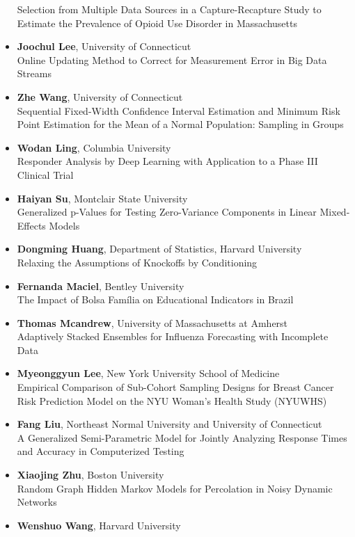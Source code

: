\begin{itemize}
Selection from Multiple Data Sources in a Capture-Recapture Study to Estimate the Prevalence of Opioid Use Disorder in Massachusetts
\item \textbf{Joochul Lee}, University of Connecticut \\
Online Updating Method to Correct for Measurement Error in Big Data Streams
\item \textbf{Zhe Wang}, University of Connecticut \\
Sequential Fixed-Width Confidence Interval Estimation and Minimum Risk Point Estimation for the Mean of a Normal Population: Sampling in Groups
\item \textbf{Wodan Ling}, Columbia University \\
Responder Analysis by Deep Learning with Application to a Phase III Clinical Trial
\item \textbf{Haiyan Su}, Montclair State University \\
Generalized p-Values for Testing Zero-Variance Components in Linear Mixed-Effects Models
\item \textbf{Dongming Huang}, Department of Statistics, Harvard University \\
Relaxing the Assumptions of Knockoffs by Conditioning
\item \textbf{Fernanda Maciel}, Bentley University \\
The Impact of Bolsa Família on Educational Indicators in Brazil
\item \textbf{Thomas Mcandrew}, University of Massachusetts at Amherst \\
Adaptively Stacked Ensembles for Influenza Forecasting with Incomplete Data
\item \textbf{Myeonggyun Lee}, New York University School of Medicine \\
Empirical Comparison of Sub-Cohort Sampling Designs for Breast Cancer Risk Prediction Model on the NYU Woman’s Health Study (NYUWHS)
\item \textbf{Fang Liu}, Northeast Normal University and University of Connecticut \\
A Generalized Semi-Parametric Model for Jointly Analyzing Response Times and Accuracy in Computerized Testing
\item \textbf{Xiaojing Zhu}, Boston University \\
Random Graph Hidden Markov Models for Percolation in Noisy Dynamic Networks
\item \textbf{Wenshuo Wang}, Harvard University \\

\end{itemize}
